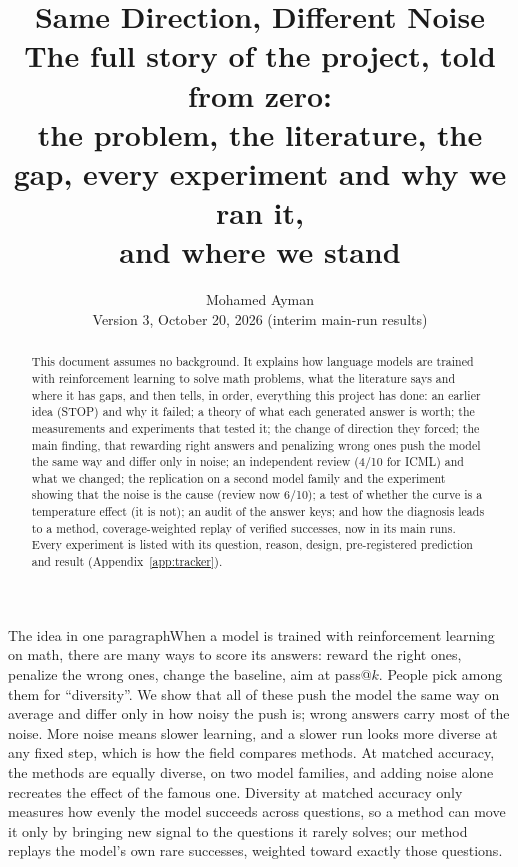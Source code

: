 \documentclass[11pt]{article}
\title{\textbf{Same Direction, Different Noise}\\[6pt]
\large The full story of the project, told from zero:\\ the problem, the literature, the gap, every experiment and why we ran it,\\ and where we stand}
\author{Mohamed Ayman\\\small Version 3, October 20, 2026 (interim main-run results)}
\date{}
\begin{document}
\maketitle

\begin{abstract}
\noindent This document assumes no background. It explains how language models are trained with reinforcement learning to solve math problems, what the literature says and where it has gaps, and then tells, in order, everything this project has done: an earlier idea (STOP) and why it failed; a theory of what each generated answer is worth; the measurements and experiments that tested it; the change of direction they forced; the main finding, that rewarding right answers and penalizing wrong ones push the model the same way and differ only in noise; an independent review (4/10 for ICML) and what we changed; the replication on a second model family and the experiment showing that the noise is the cause (review now 6/10); a test of whether the curve is a temperature effect (it is not); an audit of the answer keys; and how the diagnosis leads to a method, coverage-weighted replay of verified successes, now in its main runs. Every experiment is listed with its question, reason, design, pre-registered prediction and result (Appendix~\ref{app:tracker}).
\end{abstract}

\begin{idea}{The idea in one paragraph}When a model is trained with reinforcement learning on math, there are many ways to score its answers: reward the right ones, penalize the wrong ones, change the baseline, aim at pass@$k$. People pick among them for ``diversity''. We show that all of these push the model the same way on average and differ only in how noisy the push is; wrong answers carry most of the noise. More noise means slower learning, and a slower run looks more diverse at any fixed step, which is how the field compares methods. At matched accuracy, the methods are equally diverse, on two model families, and adding noise alone recreates the effect of the famous one. Diversity at matched accuracy only measures how evenly the model succeeds across questions, so a method can move it only by bringing new signal to the questions it rarely solves; our method replays the model's own rare successes, weighted toward exactly those questions.
\end{idea}

\setcounter{tocdepth}{1}
\tableofcontents
\newpage
\end{document}
